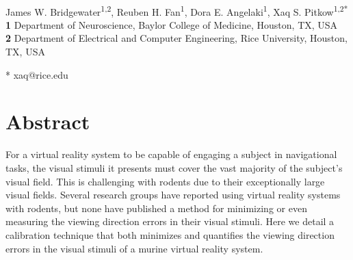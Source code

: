 \documentclass[10pt,letterpaper]{article}
\date{}
\begin{document}
\vspace*{0.2in}

\begin{flushleft}
{\Large
\textbf{}
}
\newline
\\
James W. Bridgewater\textsuperscript{1,2},
Reuben H. Fan\textsuperscript{1},
Dora E. Angelaki\textsuperscript{1},
Xaq S. Pitkow\textsuperscript{1,2*}
\\
\bigskip
\textbf{1} Department of Neuroscience, Baylor College of Medicine, Houston, TX,
USA
\\
\textbf{2} Department of Electrical and Computer Engineering, Rice University,
Houston, TX, USA
\\
\bigskip

% 
%





* xaq@rice.edu

\end{flushleft}
\section*{Abstract}
For a virtual reality system to be capable of engaging a subject in
navigational tasks, the visual stimuli it presents must cover the vast majority
of the subject's visual field. This is challenging with rodents due
to their exceptionally large visual fields.  Several research groups have reported using
virtual reality systems with rodents, but none have published a method for
minimizing or even measuring the viewing direction errors in their visual
stimuli. Here we detail a calibration technique that both minimizes and
quantifies the viewing direction errors in the visual stimuli of a murine
virtual reality system.
\end{document}
